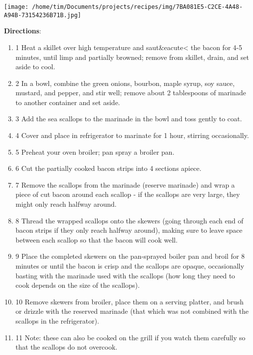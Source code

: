 \documentclass[11pt, twoside, openany]{book}
\begin{document}
\begin{minipage}[t]{0.2\linewidth}
\centering \strut\vspace*{-\baselineskip}\newline
\texttt{[image: /home/tim/Documents/projects/recipes/img/7BA081E5-C2CE-4A48-A94B-73154236B71B.jpg]}\\
\end{minipage}\vspace{3mm}
\textbf{Directions}:
\vspace{-3mm}\begin{enumerate}\setlength\itemsep{-1mm}
\item 1 Heat a skillet over high temperature and saut&eacute< the bacon for 4-5 minutes, until limp and partially browned; remove from skillet, drain, and set aside to cool. 
\item 2 In a bowl, combine the green onions, bourbon, maple syrup, soy sauce, mustard, and pepper, and stir well; remove about 2 tablespoons of marinade to another container and set aside. 
\item 3 Add the sea scallops to the marinade in the bowl and toss gently to coat. 
\item 4 Cover and place in refrigerator to marinate for 1 hour, stirring occasionally. 
\item 5 Preheat your oven broiler; pan spray a broiler pan. 
\item 6 Cut the partially cooked bacon strips into 4 sections apiece. 
\item 7 Remove the scallops from the marinade (reserve marinade) and wrap a piece of cut bacon around each scallop - if the scallops are very large, they might only reach halfway around. 
\item 8 Thread the wrapped scallops onto the skewers (going through each end of bacon strips if they only reach halfway around), making sure to leave space between each scallop so that the bacon will cook well. 
\item 9 Place the completed skewers on the pan-sprayed boiler pan and broil for 8 minutes or until the bacon is crisp and the scallops are opaque, occasionally basting with the marinade used with the scallops (how long they need to cook depends on the size of the scallops). 
\item 10 Remove skewers from broiler, place them on a serving platter, and brush or drizzle with the reserved marinade (that which was not combined with the scallops in the refrigerator). 
\item 11 Note: these can also be cooked on the grill if you watch them carefully so that the scallops do not overcook.
\end{enumerate}
\end{document}
